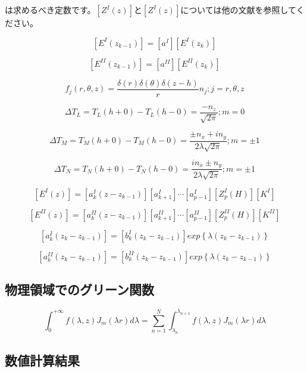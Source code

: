 は求めるべき定数です。$\left[Z^{I}\left(z\right)\right]$と$\left[Z^{I}\left(z\right)\right]$については他の文献を参照してください。

\[\left[E^{I}\left(z_{k-1}\right)\right]=\left[a^{I}\right]\left[E^{I}\left(z_{k}\right)\right]\]

\[\left[E^{II}\left(z_{k-1}\right)\right]=\left[a^{II}\right]\left[E^{II}\left(z_{k}\right)\right]\]

\[f_{j}\left(r,\theta,z\right)=\dfrac{\delta\left(r\right)\delta\left(\theta\right)\delta\left(z-h\right)}{r}n_{j};j=r,\theta,z\]

\[\Delta T_{L}=T_{L}\left(h+0\right)-T_{L}\left(h-0\right)=\dfrac{-n_{z}}{\sqrt{2\pi}};m=0\]

\[\Delta T_{M}=T_{M}\left(h+0\right)-T_{M}\left(h-0\right)=\dfrac{\pm n_{x}+in_{y}}{2\lambda\sqrt{2\pi}};m=\pm1\]

\[\Delta T_{N}=T_{N}\left(h+0\right)-T_{N}\left(h-0\right)=\dfrac{in_{x}\pm n_{y}}{2\lambda\sqrt{2\pi}};m=\pm1\]

\[\left[E^{I}\left(z\right)\right]=\left[a_{k}^{I}\left(z-z_{k-1}\right)\right]\left[a_{k+1}^{I}\right]\cdots\left[a_{p-1}^{I}\right]\left[Z_{p}^{I}\left(H\right)\right]\left[K^{I}\right]\]

\[\left[E^{II}\left(z\right)\right]=\left[a_{k}^{II}\left(z-z_{k-1}\right)\right]\left[a_{k+1}^{II}\right]\cdots\left[a_{p-1}^{II}\right]\left[Z_{p}^{II}\left(H\right)\right]\left[K^{II}\right]\]

\[\left[a_{k}^{I}\left(z_{k}-z_{k-1}\right)\right]=\left[b_{k}^{I}\left(z_{k}-z_{k-1}\right)\right]exp\left\{ \lambda\left(z_{k}-z_{k-1}\right)\right\}\]

\[\left[a_{k}^{II}\left(z_{k}-z_{k-1}\right)\right]=\left[b_{k}^{II}\left(z_{k}-z_{k-1}\right)\right]exp\left\{ \lambda\left(z_{k}-z_{k-1}\right)\right\}\]

\subsection{物理領域でのグリーン関数}

\[\int_{0}^{+\infty}f\left(\lambda,z\right)J_{m}\left(\lambda r\right)d\lambda=\sum_{n=1}^{N}\int_{\lambda_{n}}^{\lambda_{n+1}}f\left(\lambda,z\right)J_{m}\left(\lambda r\right)d\lambda\]

\subsection{数値計算結果}

